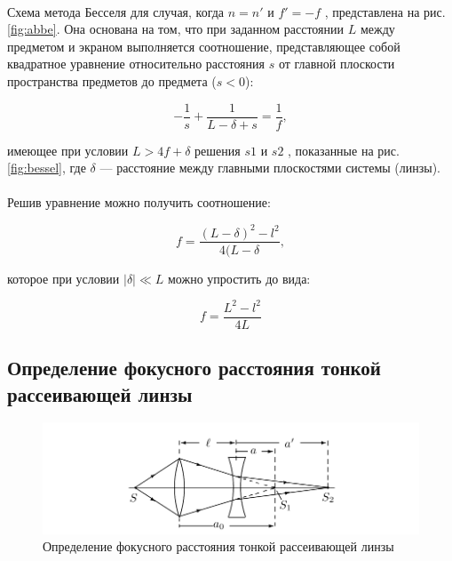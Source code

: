 \documentclass[a4paper,12pt]{article} %
\begin{document}
\paragraph{} Схема метода Бесселя для случая, когда $n = n'$ и $f' = -f$ , представлена на рис. \ref{fig:abbe}. Она основана на том, что при заданном расстоянии $L$ между предметом и экраном выполняется соотношение, представляющее собой квадратное уравнение относительно расстояния $s$ от главной плоскости пространства предметов до предмета ($s < 0$):

\begin{equation}
-\frac{1}{s} + \frac{1}{L - \delta + s} = \frac{1}{f},
\label{e:bessel1}
\end{equation}

\noindent имеющее при условии $L > 4f + \delta$ решения $s1$ и $s2$ , показанные на рис. \ref{fig:bessel}, где $\delta$ — расстояние между главными плоскостями системы (линзы).

\paragraph{} Решив уравнение можно получить соотношение:

\begin{equation}
f = \frac{(L - \delta)^2 - l^2}{4(L - \delta},
\label{e:bessel2}
\end{equation}

\noindent которое при условии $|\delta| \ll L$ можно упростить до вида:

\begin{equation}
f = \frac{L^2 - l^2}{4L}
\label{e:bessel}
\end{equation}

\subsection{Определение фокусного расстояния тонкой рассеивающей линзы}

\begin{figure}[h]
\centering
\includegraphics[width=\textwidth]{rass.png}
\caption{Определение фокусного расстояния тонкой рассеивающей линзы}
\label{fig:rass}
\end{figure}
\end{document}
